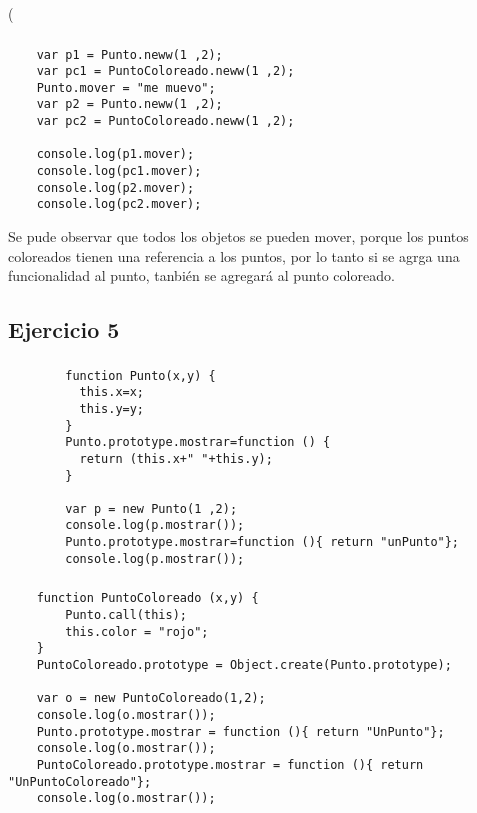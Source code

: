 \left( \documentclass[10pt,a4paper]{article}
\begin{document}
\subsubsection{}
    \begin{lstlisting}
    var p1 = Punto.neww(1 ,2);
    var pc1 = PuntoColoreado.neww(1 ,2);
    Punto.mover = "me muevo";
    var p2 = Punto.neww(1 ,2);
    var pc2 = PuntoColoreado.neww(1 ,2);

    console.log(p1.mover);
    console.log(pc1.mover);
    console.log(p2.mover);
    console.log(pc2.mover);
    \end{lstlisting}
    Se pude observar que todos los objetos se pueden mover, porque los puntos coloreados tienen una referencia a los puntos, por lo tanto si se agrga una funcionalidad al punto, tanbién se agregará al punto coloreado.
    
\subsection{Ejercicio 5}
\subsubsection{}
    \begin{lstlisting}
        function Punto(x,y) {
          this.x=x;
          this.y=y;
        }
        Punto.prototype.mostrar=function () {
          return (this.x+" "+this.y);
        }

        var p = new Punto(1 ,2);
        console.log(p.mostrar());
        Punto.prototype.mostrar=function (){ return "unPunto"};
        console.log(p.mostrar());
    \end{lstlisting}    
\subsubsection{}
	\begin{lstlisting}
	function PuntoColoreado (x,y) {
		Punto.call(this);
		this.color = "rojo";
	}
	PuntoColoreado.prototype = Object.create(Punto.prototype); 

	var o = new PuntoColoreado(1,2);
	console.log(o.mostrar());
	Punto.prototype.mostrar = function (){ return "UnPunto"};
	console.log(o.mostrar());
	PuntoColoreado.prototype.mostrar = function (){ return "UnPuntoColoreado"};
	console.log(o.mostrar());
	\end{lstlisting}
\end{document}
